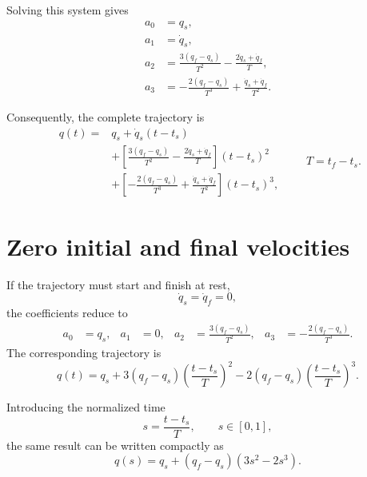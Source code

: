 \documentclass[11pt,a4paper]{article}
\begin{document}
Solving this system gives
\begin{align}
    a_0 &= q_s,\\
    a_1 &= \dot q_s,\\
    a_2 &= \frac{3(q_f-q_s)}{T^2}
           -\frac{2\dot q_s+\dot q_f}{T},\\
    a_3 &= -\frac{2(q_f-q_s)}{T^3}
           +\frac{\dot q_s+\dot q_f}{T^2}.
\end{align}

Consequently, the complete trajectory is
\begin{equation}
\boxed{
\begin{aligned}
q(t)={}&q_s+\dot q_s(t-t_s)\\
&+\left[
\frac{3(q_f-q_s)}{T^2}
-\frac{2\dot q_s+\dot q_f}{T}
\right](t-t_s)^2\\
&+\left[
-\frac{2(q_f-q_s)}{T^3}
+\frac{\dot q_s+\dot q_f}{T^2}
\right](t-t_s)^3,
\end{aligned}}
\qquad T=t_f-t_s.
\end{equation}

\section{Zero initial and final velocities}

If the trajectory must start and finish at rest,
\begin{equation}
    \dot q_s=\dot q_f=0,
\end{equation}
the coefficients reduce to
\begin{align}
    a_0 &= q_s,
    &a_1 &= 0,
    &a_2 &= \frac{3(q_f-q_s)}{T^2},
    &a_3 &= -\frac{2(q_f-q_s)}{T^3}.
\end{align}
The corresponding trajectory is
\begin{equation}
\boxed{
q(t)=q_s
+3(q_f-q_s)\left(\frac{t-t_s}{T}\right)^2
-2(q_f-q_s)\left(\frac{t-t_s}{T}\right)^3
}.
\end{equation}

Introducing the normalized time
\begin{equation}
    s=\frac{t-t_s}{T},
    \qquad s\in[0,1],
\end{equation}
the same result can be written compactly as
\begin{equation}
    \boxed{q(s)=q_s+(q_f-q_s)(3s^2-2s^3)}.
\end{equation}
\end{document}
